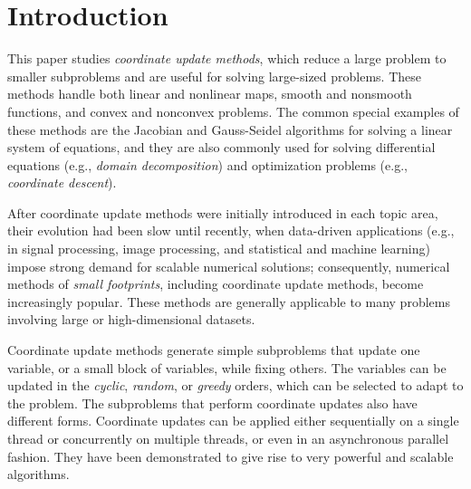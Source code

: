 \section{Introduction}
This paper studies  \emph{coordinate update methods}, which reduce a large problem to smaller subproblems and are useful for solving large-sized problems. These methods handle both  linear and nonlinear maps, smooth and nonsmooth functions, and convex and nonconvex problems. %
The common special examples of these methods are the Jacobian and Gauss-Seidel algorithms for solving a linear system of equations, and they are also commonly used for solving differential equations (e.g., \emph{domain decomposition}) and optimization problems (e.g., \emph{coordinate descent}).  

After coordinate update methods were initially introduced in each topic area, their evolution  had been slow until recently, when data-driven applications (e.g., in signal processing,  image processing, and statistical and machine learning) impose strong demand for scalable numerical solutions; consequently,  numerical methods of \emph{small footprints}, including  coordinate update methods, become increasingly popular. These methods are generally applicable to many problems involving large
or high-dimensional datasets.

Coordinate update methods generate simple subproblems that update one variable, or a small block of variables, while fixing others. The variables can be updated in  the \textit{cyclic}, \textit{random}, or \textit{greedy} orders, which can be selected to adapt to the problem. The subproblems that perform coordinate updates also have different forms. %
Coordinate updates can be  applied either sequentially on a single thread or concurrently on multiple threads, or even in an asynchronous parallel fashion. They have been demonstrated to give rise to very powerful and scalable algorithms.

